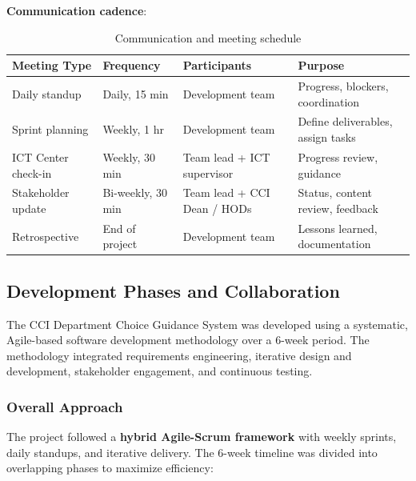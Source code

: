 \documentclass[12pt, a4paper]{article}
\newcommand{\theadrow}{\rowcolor{tableheader}}
\newcommand{\rowalt}{\rowcolor{tablerowalt}}
\begin{document}
\textbf{Communication cadence}:
\begin{table}[H]
\centering
\begin{tabularx}{\textwidth}{p{3cm}p{2.5cm}Xp{2.5cm}}
\toprule
\theadrow
\textbf{Meeting Type} & \textbf{Frequency} & \textbf{Participants} & \textbf{Purpose} \\
\midrule
Daily standup        & Daily, 15 min       & Development team                  & Progress, blockers, coordination \\[3pt]
\rowalt
Sprint planning      & Weekly, 1 hr        & Development team                  & Define deliverables, assign tasks \\[3pt]
ICT Center check-in  & Weekly, 30 min      & Team lead + ICT supervisor        & Progress review, guidance \\[3pt]
\rowalt
Stakeholder update   & Bi-weekly, 30 min   & Team lead + CCI Dean / HODs       & Status, content review, feedback \\[3pt]
Retrospective        & End of project      & Development team                  & Lessons learned, documentation \\
\bottomrule
\end{tabularx}
\caption{Communication and meeting schedule}
\end{table}

\subsection{Development Phases and Collaboration}
The CCI Department Choice Guidance System was developed using a systematic, Agile-based software development methodology over a 6-week period. The methodology integrated requirements engineering, iterative design and development, stakeholder engagement, and continuous testing.

\subsubsection*{Overall Approach}

The project followed a \textbf{hybrid Agile-Scrum framework} with weekly sprints, daily standups, and iterative delivery. The 6-week timeline was divided into overlapping phases to maximize efficiency:
\end{document}
